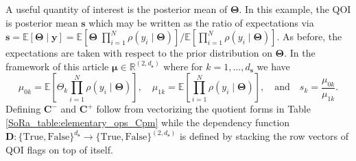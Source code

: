 \documentclass[graybox]{svmult}
\begin{document}
A useful quantity of interest is the posterior mean of $\boldsymbol{\Theta}$. In this example, the QOI is posterior mean $\boldsymbol{s}$ which may be written as the ratio of expectations via $\boldsymbol{s} = \mathbb{E}\left[\boldsymbol{\Theta} \mid \boldsymbol{y}\right] = \mathbb{E}\left[\boldsymbol{\Theta} \; \prod_{i=1}^{N} \rho(y_i \mid \boldsymbol{\Theta})\right]/\mathbb{E}\left[\prod_{i=1}^{N} \rho(y_i \mid \boldsymbol{\Theta})\right]$. As before, the expectations are taken with respect to the prior distribution on $\boldsymbol{\Theta}$. In the framework of this article $\boldsymbol{\mu} \in \mathbb{R}^{(2, d_{\boldsymbol{s}})}$ where for $k=1,\dots,d_{\boldsymbol{s}}$ we have 
$$\mu_{0k} = \mathbb{E}\left[\Theta_k \prod_{i=1}^{N} \rho(y_i \mid \boldsymbol{\Theta})\right], \quad \mu_{1k} = \mathbb{E}\left[\prod_{i=1}^{N} \rho(y_i \mid \boldsymbol{\Theta})\right], \quad \text{and} \quad s_k = \frac{\mu_{0k}}{\mu_{1k}}.$$
Defining $\boldsymbol{C}^-$ and $\boldsymbol{C}^+$ follow from vectorizing the quotient forms in Table \ref{SoRa_table:elementary_ops_Cpm} while the dependency function $\boldsymbol{D}: \{\text{True},\text{False}\}^{d_{\boldsymbol{s}}} \to \{\text{True},\text{False}\}^{(2, d_{\boldsymbol{s}})}$ is defined by stacking the row vectors of QOI flags on top of itself. 


\end{document}
